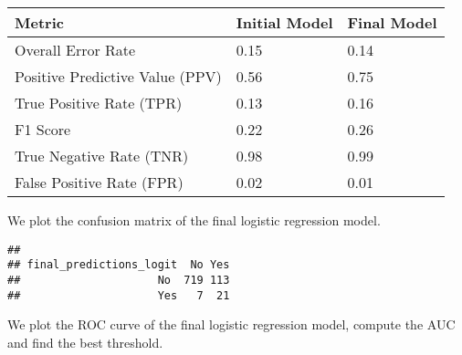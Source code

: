 \documentclass[
]{article}
\newenvironment{Shaded}{\begin{snugshade}}{\end{snugshade}}
\newcommand{\AttributeTok}[1]{\textcolor[rgb]{0.13,0.29,0.53}{#1}}
\newcommand{\ConstantTok}[1]{\textcolor[rgb]{0.56,0.35,0.01}{#1}}
\newcommand{\FunctionTok}[1]{\textcolor[rgb]{0.13,0.29,0.53}{\textbf{#1}}}
\newcommand{\NormalTok}[1]{#1}
\newcommand{\OtherTok}[1]{\textcolor[rgb]{0.56,0.35,0.01}{#1}}
\newcommand{\SpecialCharTok}[1]{\textcolor[rgb]{0.81,0.36,0.00}{\textbf{#1}}}
\newcommand{\StringTok}[1]{\textcolor[rgb]{0.31,0.60,0.02}{#1}}
\begin{document}
\begin{longtable}[]{@{}lll@{}}
\toprule\noalign{}
Metric & Initial Model & Final Model \\
\midrule\noalign{}
\endhead
\bottomrule\noalign{}
\endlastfoot
Overall Error Rate & 0.15 & 0.14 \\
Positive Predictive Value (PPV) & 0.56 & 0.75 \\
True Positive Rate (TPR) & 0.13 & 0.16 \\
F1 Score & 0.22 & 0.26 \\
True Negative Rate (TNR) & 0.98 & 0.99 \\
False Positive Rate (FPR) & 0.02 & 0.01 \\
\end{longtable}

We plot the confusion matrix of the final logistic regression model.

\begin{Shaded}
\end{Shaded}

\begin{verbatim}
##                        
## final_predictions_logit  No Yes
##                     No  719 113
##                     Yes   7  21
\end{verbatim}

We plot the ROC curve of the final logistic regression model, compute
the AUC and find the best threshold.

\begin{Shaded}
\end{Shaded}
\end{document}

